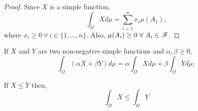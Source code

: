 \documentclass[../TGMAFFIRO.tex]{subfiles}
\begin{document}
\begin{proof}
	Since $X$ is a simple function,
	\[
	\int_\Omega X d\mu = \sum_{i=1}^n x_i \mu(A_1),
	\]
	where $x_i \geq 0 \ \forall \ i \in \{1, \ldots, n\}$. Also, $\mu(A_i) \geq 0 \ \forall \ A_i \in \mathscr{F}$.
\end{proof}

\begin{theorem}
	If $X$ and $Y$ are two non-negative simple functions and $\alpha, \beta \geq 0$,
	\begin{equation}
		\int_\Omega (\alpha X + \beta Y) d\mu = \alpha\int_\Omega X d\mu + \beta\int_\Omega Y d\mu;
	\end{equation}
	
	If $X \leq Y$ then,
	\begin{equation}
		\int_\Omega X \leq \int_\Omega Y
	\end{equation} 
\end{theorem}
\end{document}
